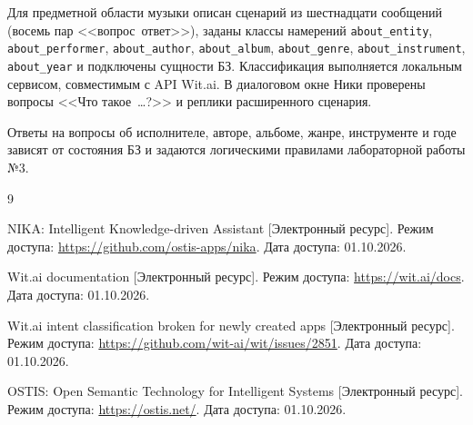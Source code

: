 
Для предметной области музыки описан сценарий из шестнадцати сообщений (восемь пар <<вопрос~\mdash  ответ>>), заданы классы намерений \texttt{about\_entity}, \texttt{about\_performer}, \texttt{about\_author}, \texttt{about\_album}, \texttt{about\_genre}, \texttt{about\_instrument}, \texttt{about\_year} и подключены сущности БЗ. Классификация выполняется локальным сервисом, совместимым с API Wit.ai. В диалоговом окне Ники проверены вопросы <<Что такое~\ldots?>> и реплики расширенного сценария.

Ответы на вопросы об исполнителе, авторе, альбоме, жанре, инструменте и годе зависят от состояния БЗ и задаются логическими правилами лабораторной работы №3.

\begin{thebibliography}{9}

	NIKA: Intelligent Knowledge-driven Assistant [Электронный ресурс]. \mdash  Режим доступа: \url{https://github.com/ostis-apps/nika}. \mdash  Дата доступа: 01.10.2026.

	Wit.ai documentation [Электронный ресурс]. \mdash  Режим доступа: \url{https://wit.ai/docs}. \mdash  Дата доступа: 01.10.2026.

	Wit.ai intent classification broken for newly created apps [Электронный ресурс]. \mdash  Режим доступа: \url{https://github.com/wit-ai/wit/issues/2851}. \mdash  Дата доступа: 01.10.2026.

	OSTIS: Open Semantic Technology for Intelligent Systems [Электронный ресурс]. \mdash  Режим доступа: \url{https://ostis.net/}. \mdash  Дата доступа: 01.10.2026.
\end{thebibliography}
